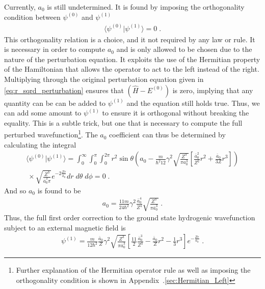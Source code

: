         Currently, $a_0$ is still undetermined. It is found by imposing the orthogonality condition between $\psi^{(0)} $ and $\psi^{(1)}$
        \begin{align}
            \langle \psi^{(0)} \vert \psi^{(1)} \rangle = 0\;.
        \end{align}
        This orthogonality relation is a choice, and it not required by any law or rule. It is necessary in order to compute $a_0$ and is only allowed to be chosen due to the nature of the perturbation equation. It exploits the use of the Hermitian property of the Hamiltonian that allows the operator to act to the left instead of the right. Multiplying through the original perturbation equation given in \eqref{eq:r_sqrd_perturbation} ensures that $\left(\hat{H} - E^{(0)} \right)$ is zero, implying that any quantity can be can be added to $\psi^{(1)}$ and the equation still holds true. Thus, we can add some amount to $\psi^{(1)}$ to ensure it is orthogonal without breaking the equality. This is a subtle trick, but one that is necessary to compute the full perturbed wavefunction\footnote{Further explanation of the Hermitian operator rule as well as imposing the orthogonality condition is shown in Appendix~.\ref{sec:Hermitian_Left}}. The $a_0$ coefficient can thus be determined by calculating the integral 
        \begin{align}
            \langle \psi^{(0)} \vert \psi^{(1)} \rangle = \int_0^\infty \int_0^\pi \int_0^{2\pi} r^2 \sin \theta \left(a_0 -\frac{m}{\hbar^2 12} \gamma^2 \sqrt{\frac{Z^3}{\pi a_0^3}} \left[\frac{\bar{a}_0^2}{Z^2} r^2 +\frac{\bar{a}_0}{3Z} r^3\right] \right)\\\ \nonumber \times \sqrt{\frac{Z^3}{\bar{a}_0^3 \pi}}e^{-2\frac{Zr}{\bar{a}_0}}dr\;d\theta\; d\phi = 0\;.
        \end{align}
        \noindent And so $a_0$ is found to be 
        \begin{align}
            a_0 = \frac{11m}{24 \hbar^2} \gamma^2 \frac{\bar{a}_0^4}{Z^4}\sqrt{\frac{Z^3}{\pi \bar{a}_0^3}} \;.
        \end{align}
        \noindent Thus, the full first order correction to the ground state hydrogenic wavefunction subject to an external magnetic field is 
        \begin{align}
            \psi^{(1)} = \frac{m}{12 \hbar^2}\frac{\bar{a}_0}{Z}\gamma^2 \sqrt{\frac{Z^3}{\pi \bar{a}_0^3}} \left[\frac{11}{2}\frac{\bar{a}_0^3}{Z^3} - \frac{\bar{a}_0}{Z} r^2 -\frac{1}{3} r^3 \right] e^{-\frac{Zr}{a_0}} \;. \label{psi_1_result}
        \end{align}
